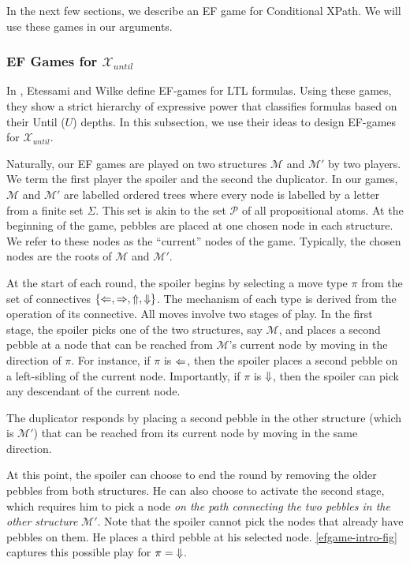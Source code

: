 \documentclass[a4paper,UKenglish,cleveref, autoref, thm-restate, numberwithinsect]{lipics-v2021}
\def\Larrow{\ensuremath\mathord{\Leftarrow}}
\def\Rarrow{\ensuremath\mathord{\Rightarrow}}
\def\Uarrow{\ensuremath\mathord{\Uparrow}}
\def\Darrow{\ensuremath\mathord{\Downarrow}}
\begin{document}
In the next few sections, we describe an EF game for Conditional XPath. We will use these games in our arguments.

\subsubsection{EF Games for $\mathcal{X}_{until}$}
In \cite{EtWi00}, Etessami and Wilke define EF-games for LTL formulas. Using these games, they show a strict hierarchy of expressive power that classifies formulas based on their \textsf{Until} ($U$) depths. In this subsection, we use their ideas to design EF-games for $\mathcal{X}_{until}$.

Naturally, our EF games are played on two structures $\mathcal{M}$ and $\mathcal{M}'$ by two players. We term the first player the spoiler and the second the duplicator. In our games, $\mathcal{M}$ and $\mathcal{M}'$ are labelled ordered trees where every node is labelled by a letter from a finite set $\Sigma$. This set is akin to the set $\mathcal{P}$ of all propositional atoms. At the beginning of the game, pebbles are placed at one chosen node in each structure. We refer to these nodes as the ``current'' nodes of the game. Typically, the chosen nodes are the roots of $\mathcal{M}$ and $\mathcal{M}'$.

At the start of each round, the spoiler begins by selecting a move type $\pi$ from the set of connectives $\{\Larrow, \Rarrow, \Uarrow, \Darrow\}$. The mechanism of each type is derived from the operation of its connective. All moves involve two stages of play. In the first stage, the spoiler picks one of the two structures, say $\mathcal{M}$, and places a second pebble at a node that can be reached from $\mathcal{M}$'s current node by moving in the direction of $\pi$. For instance, if $\pi$ is $\Larrow$, then the spoiler places a second pebble on a left-sibling of the current node. Importantly, if $\pi$ is $\Darrow$, then the spoiler can pick any descendant of the current node.

The duplicator responds by placing a second pebble in the other structure (which is $\mathcal{M}'$) that can be reached from its current node by moving in the same direction.

At this point, the spoiler can choose to end the round by removing the older pebbles from both structures. He can also choose to activate the second stage, which requires him to pick a node \emph{on the path connecting the two pebbles in the other structure} $\mathcal{M}'$. Note that the spoiler cannot pick the nodes that already have pebbles on them. He places a third pebble at his selected node. \cref{efgame-intro-fig} captures this possible play for $\pi = \Darrow$.
\end{document}
